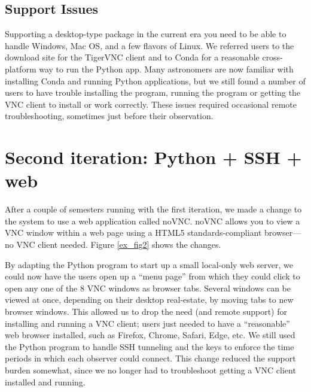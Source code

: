 \documentclass[11pt,twoside]{article}
\begin{document}
\subsection{Support Issues}
Supporting a desktop-type package in the current era you need to be able
to handle Windows, Mac OS, and a few flavors of Linux.  We referred users to the
download site for the TigerVNC client and to Conda for a reasonable cross-platform
way to run the Python app.  Many astronomers are now familiar with installing Conda and
running Python applications, but we still found a number of users to have trouble
installing the program, running the program or getting the VNC client to install or
work correctly.  These issues required occasional remote troubleshooting, sometimes
just before their observation.

\section{Second iteration: Python + SSH + web}
After a couple of semesters running with the first iteration, we made a change to the
system to use a web application called noVNC\citep{noVNC}.
noVNC allows you to view a VNC window within a web page using a HTML5 standards-compliant
browser---no VNC client needed.  Figure \ref{ex_fig2} shows the changes.

By adapting the Python program to start up a small local-only web server,
we could now have the users open up a ``menu page'' from which they could click to
open any one of the 8 VNC windows as browser tabs.  Several windows can be viewed
at once, depending on their desktop real-estate, by moving tabs to new browser windows.
This allowed us to drop the need (and remote support) for installing
and running a VNC client; users just needed to have a ``reasonable'' web browser installed,
such as Firefox, Chrome, Safari, Edge, etc.  We still used the Python
program to handle SSH tunneling and the keys to enforce the time periods in which
each observer could connect.  This change reduced the support burden somewhat,
since we no longer had to troubleshoot getting a VNC client installed and running.


\end{document}
